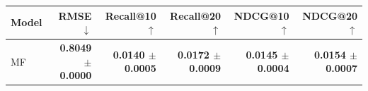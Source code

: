\begin{tabular}{lrrrrr}
\toprule
Model & RMSE $\downarrow$ & Recall@10 $\uparrow$ & Recall@20 $\uparrow$ & NDCG@10 $\uparrow$ & NDCG@20 $\uparrow$ \\
\midrule
MF & \textbf{0.8049 $\pm$ 0.0000} & \textbf{0.0140 $\pm$ 0.0005} & \textbf{0.0172 $\pm$ 0.0009} & \textbf{0.0145 $\pm$ 0.0004} & \textbf{0.0154 $\pm$ 0.0007} \\
\bottomrule
\end{tabular}
